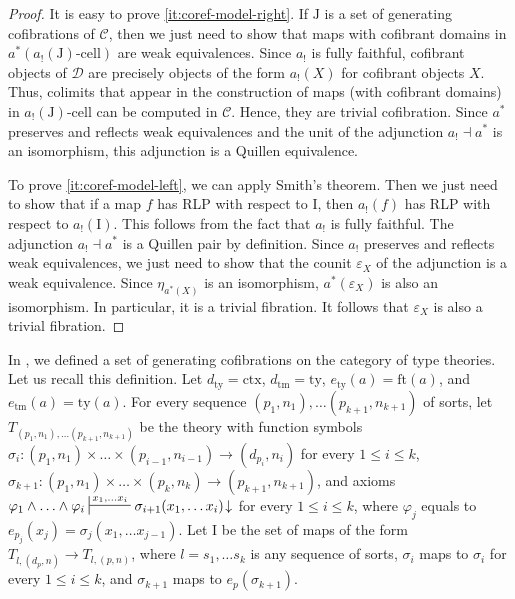 \documentclass[reqno]{amsart}
\theoremstyle{definition}
\theoremstyle{remark}
\newcommand{\fs}[1]{\mathrm{#1}}
\newcommand{\cat}[1]{\mathcal{#1}}
\newcommand{\C}{\cat{C}}
\newcommand{\D}{\cat{D}}
\newcommand{\I}{\fs{I}}
\newcommand{\J}{\fs{J}}
\newcommand{\class}[2]{#1\text{-}\mathrm{#2}}
\newcommand{\Icell}[1][\I]{\class{#1}{cell}}
\numberwithin{figure}{section}
\begin{document}
\begin{proof}
It is easy to prove \eqref{it:coref-model-right}.
If $\J$ is a set of generating cofibrations of $\C$, then we just need to show that maps with cofibrant domains in $a^*(\Icell[a_!(\J)])$ are weak equivalences.
Since $a_!$ is fully faithful, cofibrant objects of $\D$ are precisely objects of the form $a_!(X)$ for cofibrant objects $X$.
Thus, colimits that appear in the construction of maps (with cofibrant domains) in $\Icell[a_!(\J)]$ can be computed in $\C$.
Hence, they are trivial cofibration.
Since $a^*$ preserves and reflects weak equivalences and the unit of the adjunction $a_! \dashv a^*$ is an isomorphism, this adjunction is a Quillen equivalence.

To prove \eqref{it:coref-model-left}, we can apply Smith's theorem.
Then we just need to show that if a map $f$ has RLP with respect to $\I$, then $a_!(f)$ has RLP with respect to $a_!(\I)$.
This follows from the fact that $a_!$ is fully faithful.
The adjunction $a_! \dashv a^*$ is a Quillen pair by definition.
Since $a_!$ preserves and reflects weak equivalences, we just need to show that the counit $\varepsilon_X$ of the adjunction is a weak equivalence.
Since $\eta_{a^*(X)}$ is an isomorphism, $a^*(\varepsilon_X)$ is also an isomorphism.
In particular, it is a trivial fibration.
It follows that $\varepsilon_X$ is also a trivial fibration.
\end{proof}


In \cite{morita-equiv}, we defined a set of generating cofibrations on the category of type theories.
Let us recall this definition.
Let $d_\fs{ty} = \fs{ctx}$, $d_\fs{tm} = \fs{ty}$, $e_\fs{ty}(a) = \fs{ft}(a)$, and $e_\fs{tm}(a) = \fs{ty}(a)$.
For every sequence $(p_1,n_1), \ldots (p_{k+1},n_{k+1})$ of sorts, let $T_{(p_1,n_1), \ldots (p_{k+1},n_{k+1})}$ be the theory
with function symbols $\sigma_i : (p_1,n_1) \times \ldots \times (p_{i-1},n_{i-1}) \to (d_{p_i},n_i)$ for every $1 \leq i \leq k$,
$\sigma_{k+1} : (p_1,n_1) \times \ldots \times (p_k,n_k) \to (p_{k+1},n_{k+1})$,
and axioms $\varphi_1 \land \ldots \land \varphi_i \sststile{}{x_1, \ldots x_i} \sigma_{i+1}(x_1, \ldots x_i)\!\downarrow$ for every $1 \leq i \leq k$,
where $\varphi_j$ equals to $e_{p_j}(x_j) = \sigma_j(x_1, \ldots x_{j-1})$.
Let $\I$ be the set of maps of the form $T_{l, (d_p,n)} \to T_{l, (p,n)}$, where $l = s_1, \ldots s_k$ is any sequence of sorts,
$\sigma_i$ maps to $\sigma_i$ for every $1 \leq i \leq k$, and $\sigma_{k+1}$ maps to $e_p(\sigma_{k+1})$.
\end{document}
